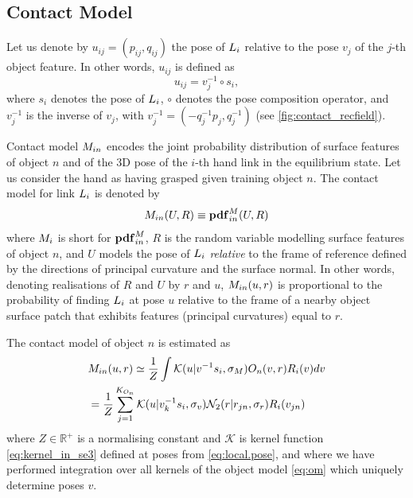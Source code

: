 \subsection{Contact Model}\label{sec:contact.model}

Let us denote by $u_{ij} = (p_{ij}, q_{ij})$ the pose of $L_i$ relative to the pose $v_j$ of the $j$-th object feature. In other words, $u_{ij}$ is defined as
\begin{equation}
u_{ij} = v_j^{-1} \circ s_i,
\label{eq:local.pose}
\end{equation}
where $s_i$ denotes the pose of $L_i$, $\circ$ denotes the pose composition operator, and $v_j^{-1}$ is the inverse of $v_j$, with $v_j^{-1} = (-q_j^{-1}p_j, q_j^{-1})$ (see \fig\ref{fig:contact_recfield}). 

Contact model $M_{in}$ encodes the joint probability distribution of surface features of object $n$ and of the 3D pose of the $i$-th hand link in the equilibrium state. Let us consider the hand as having grasped given training object $n$. The contact model for link $L_i$ is denoted by
\begin{equation}\label{eq:M}
M_{in}(U, R) \equiv \mathbf{pdf}^M_{in}(U, R)
\end{equation}
where $M_i$ is short for $\mathbf{pdf}^M_{in}$, $R$ is the random variable modelling surface features of object $n$, and $U$ models the pose of $L_i$ \emph{relative} to the frame of reference defined by the directions of principal curvature and the surface normal. In other words, denoting realisations of $R$ and $U$ by $r$ and $u$, $M_{in}(u, r)$ is proportional to the probability of finding $L_i$ at pose $u$ relative to the frame of a nearby object surface patch that exhibits features (principal curvatures) equal to $r$.

The contact model of object $n$ is estimated as
\begin{equation}\label{eq:cm_n}
\begin{split}
&M_{in}(u, r) \simeq \frac 1Z \int \mathcal{K}(u|v^{-1}s_i, \sigma_M) O_{n}(v, r) R_{i}(v) dv\\
&= \frac 1Z \sum_{j=1}^{K_{O_n}} \mathcal{K}(u|v_k^{-1}s_i, \sigma_v) \mathcal{N}_2({r}| r_{jn}, \sigma_r) R_{i}(v_{jn})
\end{split}
\end{equation}
where $Z \in \mathbb R^+$ is a normalising constant and $\mathcal{K}$ is kernel function \eqref{eq:kernel_in_se3} defined at poses from \eq\eqref{eq:local.pose}, and where we have performed integration over all kernels of the object model \eqref{eq:om} which uniquely determine poses $v$.

